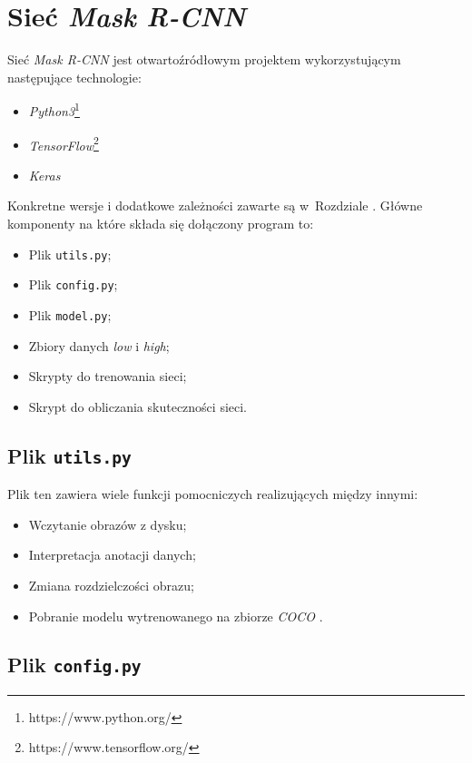 \newpage
\section{Sieć \textit{Mask R-CNN}}

Sieć \textit{Mask R-CNN} \cite{matterport-mask-rcnn} jest otwartoźródłowym projektem wykorzystującym następujące technologie:
\begin{itemize}
  \item \textit{Python3}\footnote{https://www.python.org/}
  \item \textit{TensorFlow}\footnote{https://www.tensorflow.org/}
  \item \textit{Keras} \cite{keras}
\end{itemize}

Konkretne wersje i dodatkowe zależności zawarte są w~Rozdziale . Główne komponenty na które składa się dołączony program to:

\begin{itemize}
\item Plik \texttt{utils.py};
  \item Plik \texttt{config.py};
  \item Plik  \texttt{model.py};
  \item Zbiory danych \textit{low} i \textit{high};
  \item Skrypty do trenowania sieci;
  \item Skrypt do obliczania skuteczności sieci.
\end{itemize}

\subsection*{Plik \texttt{utils.py}}

Plik ten zawiera wiele funkcji pomocniczych realizujących między innymi:
\begin{itemize}
  \item Wczytanie obrazów z dysku;
  \item Interpretacja anotacji danych;
  \item Zmiana rozdzielczości obrazu;
  \item Pobranie modelu wytrenowanego na zbiorze \textit{COCO} \cite{coco}.
\end{itemize}

\subsection*{Plik \texttt{config.py}}

